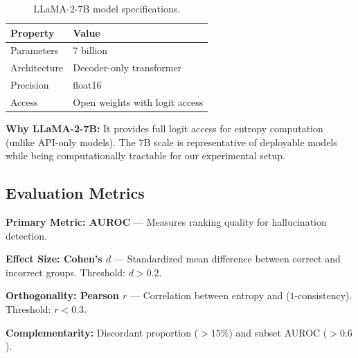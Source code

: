 \begin{table}[h]
\centering
\begin{tabular}{@{}ll@{}}
\toprule
\textbf{Property} & \textbf{Value} \\
\midrule
Parameters & 7 billion \\
Architecture & Decoder-only transformer \\
Precision & float16 \\
Access & Open weights with logit access \\
\bottomrule
\end{tabular}
\caption{LLaMA-2-7B model specifications.}
\label{tab:model}
\end{table}

\textbf{Why LLaMA-2-7B:} It provides full logit access for entropy computation (unlike API-only models). The 7B scale is representative of deployable models while being computationally tractable for our experimental setup.

\subsection{Evaluation Metrics}

\textbf{Primary Metric: AUROC} --- Measures ranking quality for hallucination detection.

\textbf{Effect Size: Cohen's $d$} --- Standardized mean difference between correct and incorrect groups. Threshold: $d > 0.2$.

\textbf{Orthogonality: Pearson $r$} --- Correlation between entropy and ($1$-consistency). Threshold: $r < 0.3$.

\textbf{Complementarity:} Discordant proportion ($>15\%$) and subset AUROC ($>0.6$).
